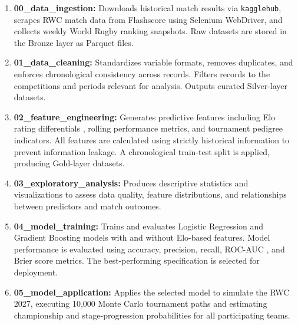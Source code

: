 \documentclass[12pt,a4paper,onecolumn]{article}
\begin{document}
\vspace{0.5cm}
\begin{enumerate}[label=\textbf{\arabic*.}, leftmargin=1.5cm, itemsep=0.5em, parsep=0.5em]
\item \textbf{00\_data\_ingestion:} Downloads historical match results via \texttt{kagglehub}, scrapes RWC match data from Flashscore using Selenium WebDriver, and collects weekly World Rugby ranking snapshots. Raw datasets are stored in the Bronze layer as Parquet files.

\item \textbf{01\_data\_cleaning:} Standardizes variable formats, removes duplicates, and enforces chronological consistency \cite{Bergmeir2012} across records. Filters records to the competitions and periods relevant for analysis. Outputs curated Silver-layer datasets.

\item \textbf{02\_feature\_engineering:} Generates predictive features including Elo rating differentials \cite{Hvattum2010}, rolling performance metrics, and tournament pedigree indicators. All features are calculated using strictly historical information to prevent information leakage. \cite{Bergmeir2012} A chronological train-test split is applied, producing Gold-layer datasets.

\item \textbf{03\_exploratory\_analysis:} Produces descriptive statistics and visualizations to assess data quality, feature distributions, and relationships between predictors and match outcomes.

\item \textbf{04\_model\_training:} Trains and evaluates Logistic Regression and Gradient Boosting models \cite{Friedman2001} with and without Elo-based features. Model performance is evaluated using accuracy, precision, recall, ROC-AUC \cite{Hanley1982}, and Brier score \cite{Brier1950} metrics. The best-performing specification is selected for deployment.

\item \textbf{05\_model\_application:} Applies the selected model to simulate the RWC 2027, executing 10,000 Monte Carlo tournament paths \cite{Leitner2010} and estimating championship and stage-progression probabilities for all participating teams.
\end{enumerate}
\end{document}
